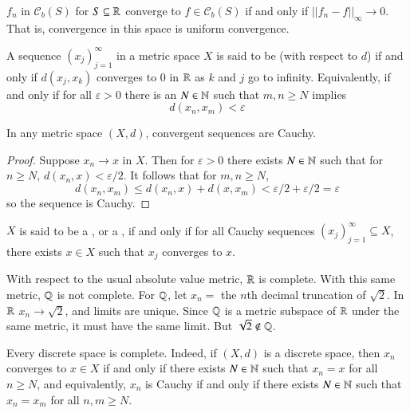 \begin{eg}
    $f_n$ in $\mathcal{C}_b(S)$ for $S \subseteq \mathbb R$ converge to $f \in \mathcal{C}_b(S)$ if and only if $||f_n-f||_{\infty}\rightarrow 0$. That is, convergence in this space is uniform convergence.
\end{eg}


\begin{defn}
    A sequence $(x_j)_{j=1}^{\infty}$ in a metric space $X$ is said to be  (with respect to $d$) if and only if $d(x_j,x_k)$ converges to $0$ in $\mathbb R$ as $k$ and $j$ go to infinity. Equivalently, if and only if for all $\varepsilon > 0$ there is an $N \in \mathbb N$ such that $m,n \geq N$ implies $$d(x_n,x_m) < \varepsilon$$
\end{defn}

\begin{prop}
    In any metric space $(X,d)$, convergent sequences are Cauchy.
\end{prop}
\begin{proof}
    Suppose $x_n\rightarrow x$ in $X$. Then for $\varepsilon > 0$ there exists $N \in \mathbb N$ such that for $n \geq N$, $d(x_n,x) < \varepsilon/2$. It follows that for $m,n \geq N$, $$d(x_n,x_m) \leq d(x_n,x) + d(x,x_m) < \varepsilon/2+\varepsilon/2 = \varepsilon$$ so the sequence is Cauchy.
\end{proof}


\begin{defn}
    $X$ is said to be a , or a , if and only if for all Cauchy sequences $(x_j)_{j=1}^{\infty} \subseteq X$, there exists $x \in X$ such that $x_j$ converges to $x$.
\end{defn}

\begin{eg}
    With respect to the usual absolute value metric, $\mathbb R$ is complete. With this same metric, $\mathbb Q$ is not complete. For $\mathbb Q$, let $x_n = $ the $n$th decimal truncation of $\sqrt{2}$. In $\mathbb R$ $x_n\rightarrow \sqrt{2}$, and limits are unique. Since $\mathbb Q$ is a metric subspace of $\mathbb R$ under the same metric, it must have the same limit. But $\sqrt{2} \notin \mathbb Q$.
\end{eg}

\begin{eg}
    Every discrete space is complete. Indeed, if $(X,d)$ is a discrete space, then $x_n$ converges to $x \in X$ if and only if there exists $N \in \mathbb N$ such that $x_n = x$ for all $n \geq N$, and equivalently, $x_n$ is Cauchy if and only if there exists $N \in \mathbb N$ such that $x_n = x_m$ for all $n,m \geq N$.
\end{eg}

